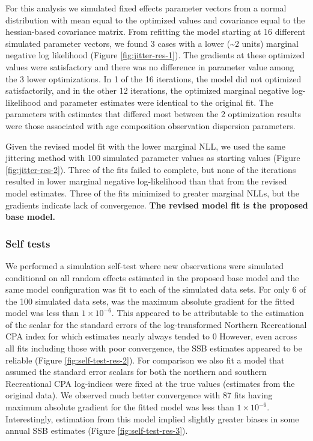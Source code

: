 \documentclass[
]{article}
\begin{document}
For this analysis we simulated fixed effects parameter vectors from a normal distribution with mean equal to the optimized values and covariance equal to the hessian-based covariance matrix. From refitting the model starting at 16 different simulated parameter vectors, we found 3 cases with a lower (\textasciitilde2 units) marginal negative log likelihood (Figure \ref{fig:jitter-res-1}). The gradients at these optimized values were satisfactory and there was no difference in parameter value among the 3 lower optimizations. In 1 of the 16 iterations, the model did not optimized satisfactorily, and in the other 12 iterations, the optimized marginal negative log-likelihood and parameter estimates were identical to the original fit. The parameters with estimates that differed most between the 2 optimization results were those associated with age composition observation dispersion parameters.

Given the revised model fit with the lower marginal NLL, we used the same jittering method with 100 simulated parameter values as starting values (Figure \ref{fig:jitter-res-2}). Three of the fits failed to complete, but none of the iterations resulted in lower marginal negative log-likelihood than that from the revised model estimates. Three of the fits minimized to greater marginal NLLs, but the gradients indicate lack of convergence. \textbf{The revised model fit is the proposed base model.}

\hypertarget{self-tests}{%
\subsubsection{Self tests}\label{self-tests}}

We performed a simulation self-test where new observations were simulated conditional on all random effects estimated in the proposed base model and the same model configuration was fit to each of the simulated data sets. For only 6 of the 100 simulated data sets, was the maximum absolute gradient for the fitted model was less than \(1\times10^{-6}\). This appeared to be attributable to the estimation of the scalar for the standard errors of the log-transformed Northern Recreational CPA index for which estimates nearly always tended to 0 However, even across all fits including those with poor convergence, the SSB estimates appeared to be reliable (Figure \ref{fig:self-test-res-2}). For comparison we also fit a model that assumed the standard error scalars for both the northern and southern Recreational CPA log-indices were fixed at the true values (estimates from the original data). We observed much better convergence with 87 fits having maximum absolute gradient for the fitted model was less than \(1\times10^{-6}\). Interestingly, estimation from this model implied slightly greater biases in some annual SSB estimates (Figure \ref{fig:self-test-res-3}).
\end{document}

